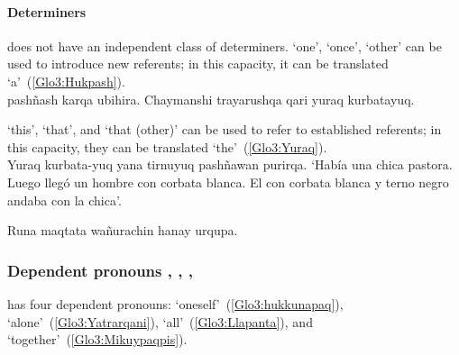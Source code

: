 \paragraph{Determiners}
\SYQ{} does not have an independent class of determiners.  ‘one’, ‘once’, ‘other’ can be used to introduce new referents; in this capacity, it can be translated ‘a’~(\ref{Glo3:Hukpash}).\\

%
{ pashñash karqa ubihira. Chaymanshi trayarushqa  qari yuraq kurbatayuq.}%
{}%
{}{}%

\noindent
{} ‘this’,  ‘that’, and  ‘that (other)’ can be used to refer to established referents; in this capacity, they can be translated ‘the’~(\ref{Glo3:Yuraq}).\\

%
{Yuraq kurbata-yuq yana tirnuyuq  pashñawan purirqa.}%
{}%
%
{‘Había una chica pastora. Luego llegó un hombre con corbata blanca. El con corbata blanca y terno negro andaba con la chica’.}%
{}{}%

%
{Runa  maqtata wañurachin hanay urqupa.}%
{}%
{}{}%

\subsubsection{Dependent pronouns , , , }\label{ssec:deppro}
\SYQ{} has four dependent pronouns:  ‘oneself’~(\ref{Glo3:hukkunapaq}),  ‘alone’~(\ref{Glo3:Yatrarqani}),  ‘all’~(\ref{Glo3:Llapanta}), and  ‘together’~(\ref{Glo3:Mikuypaqpis}).\\

